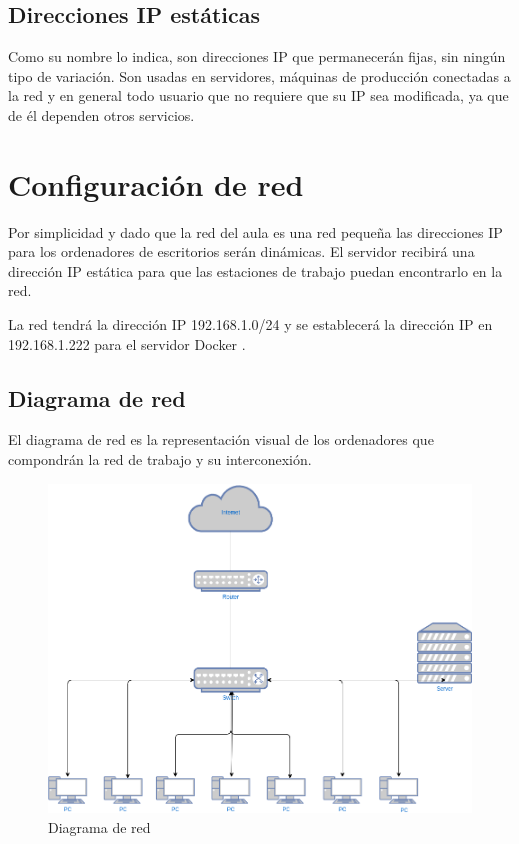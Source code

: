 			
		\subsection{Direcciones IP estáticas}\par
			
			Como su nombre lo indica, son direcciones IP que permanecerán fijas, sin ningún tipo de variación. Son usadas en servidores, máquinas de producción conectadas a la red y en general todo usuario que no requiere que su IP sea modificada, ya que de él dependen otros servicios.
	
			
	\section{Configuración de red}	
	
		Por simplicidad y dado que la red del aula es una red pequeña las direcciones IP para los ordenadores de escritorios serán dinámicas. El servidor recibirá una dirección IP estática para que las estaciones de trabajo puedan encontrarlo en la red.\par
	
		La red tendrá la dirección IP 192.168.1.0/24 y se establecerá la dirección IP en 192.168.1.222 para el servidor Docker .\par
		
		\subsection{Diagrama de red}
				
			El diagrama de red es la representación visual de los ordenadores que compondrán la red de trabajo y su interconexión.\par
			
			\begin{figure}[h]
				\centering
				\includegraphics[height=0.6\textwidth]{imagenes/red/diagrama.png}
				\caption{Diagrama de red}
				\label{fig:red local lan}
			\end{figure}
			
				
